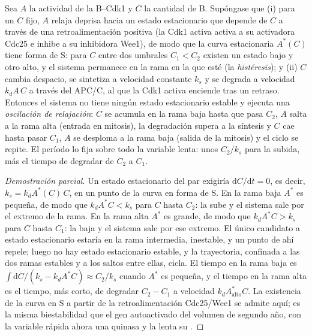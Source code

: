 \begin{theorem}\label{thm:b3:cell-cycle-apoptosis:oscillator}
Sea $A$ la actividad de la  B--Cdk1 y $C$ la cantidad de 
B. Supóngase que (i) para un $C$ fijo, $A$ relaja deprisa hacia un estado
estacionario que depende de $C$ a través de una retroalimentación
positiva (la Cdk1 activa activa a su activadora Cdc25 e inhibe a su
inhibidora Wee1), de modo que la curva estacionaria $A^{*}(C)$ tiene
forma de S: para $C$ entre dos umbrales $C_{1} < C_{2}$ existen un estado
bajo y otro alto, y el sistema permanece en la rama en la que esté (la
\emph{histéresis}); y (ii) $C$ cambia despacio, se sintetiza a velocidad
constante $k_{s}$ y se degrada a velocidad $k_{d}A\,C$ a través del
APC/C, al que la Cdk1 activa enciende tras un retraso. Entonces el
sistema no tiene ningún estado estacionario estable y ejecuta una
\emph{oscilación de relajación}: $C$ se acumula en la rama baja hasta que
pasa $C_{2}$, $A$ salta a la rama alta (entrada en mitosis), la
degradación supera a la síntesis y $C$ cae hasta pasar $C_{1}$, $A$ se
desploma a la rama baja (salida de la mitosis) y el ciclo se repite. El
período lo fija sobre todo la variable lenta: unos $C_{2}/k_{s}$ para la
subida, más el tiempo de degradar de $C_{2}$ a $C_{1}$.
\end{theorem}
\begin{proof}[Demostración parcial]
Un estado estacionario del par exigiría $\mathrm{d}C/\mathrm{d}t = 0$, es
decir, $k_{s} = k_{d}A^{*}(C)\,C$, en un punto de la curva en forma de S.
En la rama baja $A^{*}$ es pequeña, de modo que $k_{d}A^{*}C < k_{s}$
para $C$ hasta $C_{2}$: la  sube y el sistema sale por el extremo
de la rama. En la rama alta $A^{*}$ es grande, de modo que
$k_{d}A^{*}C > k_{s}$ para $C$ hasta $C_{1}$: la  baja y el
sistema sale por ese extremo. El único candidato a estado estacionario
estaría en la rama intermedia, inestable, y un punto de ahí repele; luego
no hay estado estacionario estable, y la trayectoria, confinada a las dos
ramas estables y a los saltos entre ellas, cicla. El tiempo en la rama
baja es $\int \mathrm{d}C/(k_{s} - k_{d}A^{*}C) \approx C_{2}/k_{s}$
cuando $A^{*}$ es pequeña, y el tiempo en la rama alta es el tiempo, más
corto, de degradar $C_{2} - C_{1}$ a velocidad
$k_{d}A^{*}_{\text{alto}}C$. La existencia de la curva en S a partir de
la retroalimentación Cdc25/Wee1 se admite aquí; es la misma
biestabilidad que el gen autoactivado del volumen de segundo año, con la
variable rápida ahora una quinasa y la lenta su .
\end{proof}

